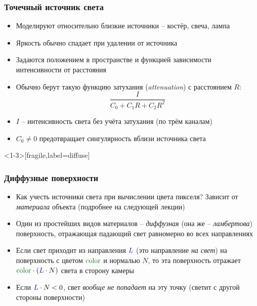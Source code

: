 \documentclass[10pt]{beamer}
\begin{document}
\begin{frame}[fragile]
\frametitle{Точечный источник света}
\begin{itemize}
\item Моделируют относительно близкие источники -- костёр, свеча, лампа
\pause
\item Яркость обычно спадает при удалении от источника
\pause
\item Задаются положением в пространстве и функцией зависимости интенсивности от расстояния
\pause
\item Обычно берут такую функцию затухания (\textit{attenuation}) с расстоянием \begin{math}R\end{math}:
\begin{equation*}
\frac{I}{C_0 + C_1 R + C_2 R^2}
\end{equation*}
\pause
\pause
\item \begin{math}I\end{math} -- интенсивность света без учёта затухания (по трём каналам)
\item \begin{math}C_0\neq 0\end{math} предотвращает сингулярность вблизи источника света
\end{itemize}
\end{frame}

\begin{frame}<1-3>[fragile,label=diffuse]
\frametitle{Диффузные поверхности}
\begin{itemize}
\item Как учесть источники света при вычислении цвета пикселя? \pause Зависит от \textit{материала} объекта (подробнее на следующей лекции)
\pause
\item Один из простейших видов материалов -- \textit{диффузная} (она же -- \textit{ламбертова}) поверхность, отражающая падающий свет равномерно во всех направлениях
\pause
\item Если свет приходит из направления \begin{math}{\color{blue}L}\end{math} (это направление \textit{на свет}) на поверхность с цветом \begin{math}\color{green}\operatorname{color}\end{math} и нормалью \begin{math}N\end{math}, то эта поверхность отражает \begin{math}{\color{green}\operatorname{color}}\cdot({\color{blue}L} \cdot N)\end{math} света в сторону камеры
\pause
\item Если \begin{math}{\color{blue}L} \cdot N < 0\end{math}, свет \textit{вообще не попадает} на эту точку (светит с другой стороны поверхности)
\end{itemize}
\end{frame}
\end{document}
